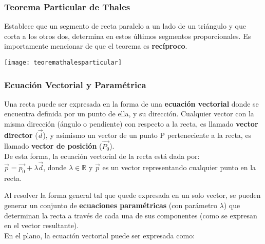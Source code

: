\subsubsection{Teorema Particular de Thales}
Establece que un segmento de recta paralelo a un lado de un triángulo y que corta a los otros dos, determina en estos últimos segmentos proporcionales. Es importamente mencionar de que el teorema es \textbf{recíproco}.
\begin{center}
    \texttt{[image: teoremathalesparticular]}
\end{center}
\subsubsection{Ecuación Vectorial y Paramétrica}
Una recta puede ser expresada en la forma de una \textbf{ecuación vectorial} donde se encuentra definida por un punto de ella, y su dirección. Cualquier vector con la misma dirección (ángulo o pendiente) con respecto a la recta, es llamado \textbf{vector director} ($\vec{d}$), y asimismo un vector de un punto P perteneciente a la recta, es llamado \textbf{vector de posición} ($\vec{P_0}$).\\

De esta forma, la ecuación vectorial de la recta está dada por: \\
$\vec{p} = \vec{p_0} + \lambda\vec{d}$, donde $\lambda \in \mathbb{R}$ y $\vec{p}$ es un vector representando cualquier punto en la recta.



Al resolver la forma general tal que quede expresada en un solo vector, se pueden generar un conjunto de \textbf{ecuaciones paramétricas} (con parámetro $\lambda$) que determinan la recta a través de cada una de sus componentes (como se expresan en el vector resultante).\\

En el plano, la ecuación vectorial puede ser expresada como:

